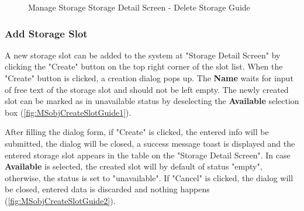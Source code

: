 \begin{figure}[H]
	\centering

    \caption{Manage Storage Storage Detail Screen - Delete Storage Guide}
	\label{fig:MSobjDeleteGuide}
\end{figure}


\subsubsection{Add Storage Slot}
\label{subsubsec:addSlot}

A new storage slot can be added to the system at "Storage Detail Screen" by clicking the "Create" button on the top right corner of the slot list.
When the "Create" button is clicked, a creation dialog pops up. The \textbf{Name} waits for input of free text of the storage slot and should not be left empty. The newly created slot can be marked as in unavailable status by deselecting the \textbf{Available} selection box (\autoref{fig:MSobjCreateSlotGuide1}).

After filling the dialog form, if "Create" is clicked, the entered info will be submitted, the dialog will be closed, a success message toast is displayed and the entered storage slot appears in the table on the "Storage Detail Screen". In case \textbf{Available} is selected, the created slot will by default of status "empty", otherwise, the status is set to "unavailable". If "Cancel" is clicked, the dialog will be closed, entered data is discarded and nothing happens (\autoref{fig:MSobjCreateSlotGuide2}).

